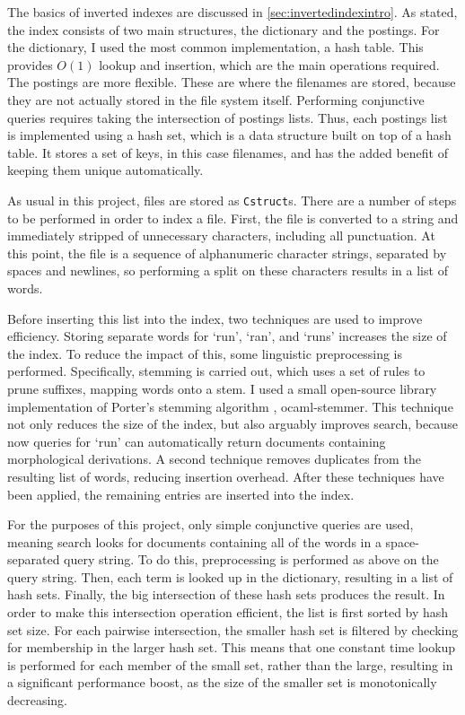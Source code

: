 \documentclass[12pt,a4paper,twoside,openright]{report}
\begin{document}
The basics of inverted indexes are discussed in \cref{sec:invertedindexintro}. As stated, the index consists of two main structures, the dictionary and the postings. For the dictionary, I used the most common implementation, a hash table. This provides $O(1)$ lookup and insertion, which are the main operations required. The postings are more flexible. These are where the filenames are stored, because they are not actually stored in the file system itself. Performing conjunctive queries requires taking the intersection of postings lists. Thus, each postings list is implemented using a hash set, which is a data structure built on top of a hash table. It stores a set of keys, in this case filenames, and has the added benefit of keeping them unique automatically.

As usual in this project, files are stored as \texttt{Cstruct}s. There are a number of steps to be performed in order to index a file. First, the file is converted to a string and immediately stripped of unnecessary characters, including all punctuation. At this point, the file is a sequence of alphanumeric character strings, separated by spaces and newlines, so performing a split on these characters results in a list of words.

Before inserting this list into the index, two techniques are used to improve efficiency. Storing separate words for `run', `ran', and `runs' increases the size of the index. To reduce the impact of this, some linguistic preprocessing is performed. Specifically, stemming is carried out, which uses a set of rules to prune suffixes, mapping words onto a stem. I used a small open-source library implementation of Porter's stemming algorithm \cite{porter1980algorithm}, ocaml-stemmer. This technique not only reduces the size of the index, but also arguably improves search, because now queries for `run' can automatically return documents containing morphological derivations. A second technique removes duplicates from the resulting list of words, reducing insertion overhead. After these techniques have been applied, the remaining entries are inserted into the index.

For the purposes of this project, only simple conjunctive queries are used, meaning search looks for documents containing all of the words in a space-separated query string. To do this, preprocessing is performed as above on the query string. Then, each term is looked up in the dictionary, resulting in a list of hash sets. Finally, the big intersection of these hash sets produces the result. In order to make this intersection operation efficient, the list is first sorted by hash set size. For each pairwise intersection, the smaller hash set is filtered by checking for membership in the larger hash set. This means that one constant time lookup is performed for each member of the small set, rather than the large, resulting in a significant performance boost, as the size of the smaller set is monotonically decreasing.
\end{document}
